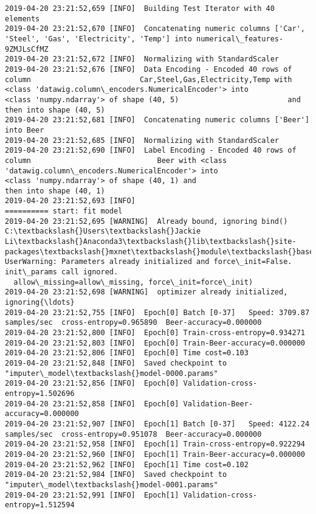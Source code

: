 \documentclass[11pt]{article}
\begin{document}
\begin{Verbatim}[commandchars=\\\{\}]
2019-04-20 23:21:52,659 [INFO]  Building Test Iterator with 40 elements
2019-04-20 23:21:52,670 [INFO]  Concatenating numeric columns ['Car', 'Steel', 'Gas', 'Electricity', 'Temp'] into numerical\_features-9ZMJLsCfMZ
2019-04-20 23:21:52,672 [INFO]  Normalizing with StandardScaler
2019-04-20 23:21:52,676 [INFO]  Data Encoding - Encoded 40 rows of column                         Car,Steel,Gas,Electricity,Temp with <class 'datawig.column\_encoders.NumericalEncoder'> into                         <class 'numpy.ndarray'> of shape (40, 5)                         and then into shape (40, 5)
2019-04-20 23:21:52,681 [INFO]  Concatenating numeric columns ['Beer'] into Beer
2019-04-20 23:21:52,685 [INFO]  Normalizing with StandardScaler
2019-04-20 23:21:52,690 [INFO]  Label Encoding - Encoded 40 rows of column                             Beer with <class 'datawig.column\_encoders.NumericalEncoder'> into                             <class 'numpy.ndarray'> of shape (40, 1) and                             then into shape (40, 1)
2019-04-20 23:21:52,693 [INFO]  
========== start: fit model
2019-04-20 23:21:52,695 [WARNING]  Already bound, ignoring bind()
C:\textbackslash{}Users\textbackslash{}Jackie Li\textbackslash{}Anaconda3\textbackslash{}lib\textbackslash{}site-packages\textbackslash{}mxnet\textbackslash{}module\textbackslash{}base\_module.py:503: UserWarning: Parameters already initialized and force\_init=False. init\_params call ignored.
  allow\_missing=allow\_missing, force\_init=force\_init)
2019-04-20 23:21:52,698 [WARNING]  optimizer already initialized, ignoring{\ldots}
2019-04-20 23:21:52,755 [INFO]  Epoch[0] Batch [0-37]	Speed: 3709.87 samples/sec	cross-entropy=0.965890	Beer-accuracy=0.000000
2019-04-20 23:21:52,800 [INFO]  Epoch[0] Train-cross-entropy=0.934271
2019-04-20 23:21:52,803 [INFO]  Epoch[0] Train-Beer-accuracy=0.000000
2019-04-20 23:21:52,806 [INFO]  Epoch[0] Time cost=0.103
2019-04-20 23:21:52,848 [INFO]  Saved checkpoint to "imputer\_model\textbackslash{}model-0000.params"
2019-04-20 23:21:52,856 [INFO]  Epoch[0] Validation-cross-entropy=1.502696
2019-04-20 23:21:52,858 [INFO]  Epoch[0] Validation-Beer-accuracy=0.000000
2019-04-20 23:21:52,907 [INFO]  Epoch[1] Batch [0-37]	Speed: 4122.24 samples/sec	cross-entropy=0.951078	Beer-accuracy=0.000000
2019-04-20 23:21:52,958 [INFO]  Epoch[1] Train-cross-entropy=0.922294
2019-04-20 23:21:52,960 [INFO]  Epoch[1] Train-Beer-accuracy=0.000000
2019-04-20 23:21:52,962 [INFO]  Epoch[1] Time cost=0.102
2019-04-20 23:21:52,984 [INFO]  Saved checkpoint to "imputer\_model\textbackslash{}model-0001.params"
2019-04-20 23:21:52,991 [INFO]  Epoch[1] Validation-cross-entropy=1.512594

\end{Verbatim}
\end{document}
